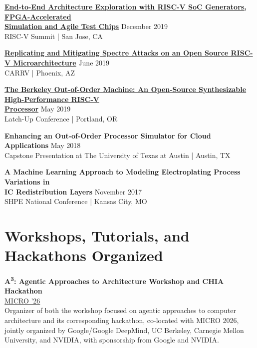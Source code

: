 \documentclass[line]{res}
\begin{document}
\begin{resume}
\textbf{\href{https://www.youtube.com/watch?v=MaSZuHhOE24}{End-to-End Architecture Exploration with RISC-V SoC Generators, FPGA-Accelerated\\Simulation and Agile Test Chips}} \hfill December 2019
\\
RISC-V Summit | San Jose, CA
\vspace{-1mm}

\textbf{\href{https://carrv.github.io/2019/}{Replicating and Mitigating Spectre Attacks on an Open Source RISC-V Microarchitecture}} \hfill June 2019
\\
CARRV | Phoenix, AZ
\vspace{-1mm}

\textbf{\href{https://youtu.be/WNf3Dq9wflQ?si=jQcMmZWhbsHAUfTB}{The Berkeley Out-of-Order Machine: An Open-Source Synthesizable High-Performance RISC-V\\Processor}} \hfill May 2019
\\
Latch-Up Conference | Portland, OR
\vspace{-1mm}

\textbf{Enhancing an Out-of-Order Processor Simulator for Cloud Applications} \hfill May 2018
\\
Capstone Presentation at The University of Texas at Austin | Austin, TX
\vspace{-1mm}

\textbf{A Machine Learning Approach to Modeling Electroplating Process Variations in\\IC Redistribution Layers} \hfill November 2017
\\
SHPE National Conference | Kansas City, MO

\section{\Large{Workshops, Tutorials, and Hackathons Organized}}
\label{sec:tutorialsworkshops}
\vspace{2mm}

\textbf{A\textsuperscript{3}: Agentic Approaches to Architecture Workshop and CHIA Hackathon}
\\
\href{https://agentic-arch.org/index.html}{MICRO '26}
\vspace{0.5mm}
\\
Organizer of both the workshop focused on agentic approaches to computer architecture and its corresponding hackathon, co-located with MICRO 2026, jointly organized by Google/Google DeepMind, UC Berkeley, Carnegie Mellon University, and NVIDIA, with sponsorship from Google and NVIDIA.


\end{resume}
\end{document}
